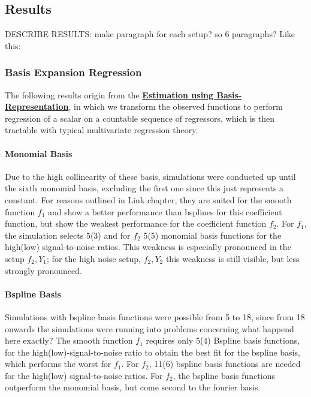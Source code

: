 \documentclass[11pt,twoside,a4paper]{article}
\begin{document}
	
	\subsection{Results}
	{\color{green}DESCRIBE RESULTS: make paragraph for each setup? so 6 paragraphs? Like this: }
	
	
	\subsubsection{Basis Expansion Regression}
	The following results origin from the \hyperref[basis_exp_transf]{\textbf{Estimation using Basis-Representation}}, in which we transform the observed functions to perform regression of a scalar on a countable sequence of regressors, which is then tractable with typical multivariate regression theory. 
	
	\paragraph{Monomial Basis}
	Due to the high collinearity of these basis, simulations were conducted up until the sixth monomial basis, excluding the first one since this just represents a constant. For reasons outlined in {\color{green} Link chapter}, they are suited for the smooth function $f_1$ and show a better performance than bsplines for this coefficient function, but show the weakest performance for the coefficient function $f_2$. For $f_1$, the simulation selects 5(3) and for $f_2$ 5(5) monomial basis functions for the high(low) signal-to-noise ratios. This weakness is especially pronounced in the setup $f_2,Y_1$; for the high noise setup, $f_2, Y_2$ this weakness is still visible, but less strongly pronounced.
	
	\paragraph{Bspline Basis}
	Simulations with bspline basis functions were possible from 5 to 18, since from 18 onwards the simulations were running into problems concerning {\color{green} what happend here exactly?}
The smooth function $f_1$ requires only 5(4) Bspline basis functions, for the high(low)-signal-to-noise ratio to obtain the best fit for the bspline basis, which performs the worst for $f_1$. For $f_2$, 11(6) bspline basis functions are needed for the high(low) signal-to-noise ratios. For $f_2$, the bspline basis functions outperform the monomial basis, but come second to the fourier basis.
	
\end{document}

